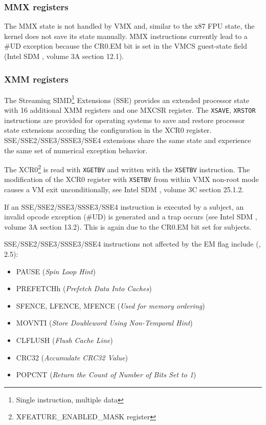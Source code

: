 \subsubsection{MMX registers}
The MMX state is not handled by VMX and, similar to the x87 FPU state, the
kernel does not save its state manually. MMX instructions currently lead to a
\#UD exception because the CR0.EM bit is set in the VMCS guest-state field
(Intel SDM \cite{IntelSDM}, volume 3A section 12.1).

\subsubsection{XMM registers}
The Streaming SIMD\footnote{Single instruction, multiple data}
Extensions (SSE) provides an extended processor state with
16 additional XMM registers and one MXCSR register. The \texttt{XSAVE},
\texttt{XRSTOR} instructions are provided for operating systems to save and
restore processor state extensions according the configuration in the XCR0
register. SSE/SSE2/SSE3/SSSE3/SSE4 extensions share the same state and
experience the same set of numerical exception behavior.

The XCR0\footnote{XFEATURE\_ENABLED\_MASK register} is read with
\texttt{XGETBV} and written with the \texttt{XSETBV} instruction. The
modification of the XCR0 register with \texttt{XSETBV} from within VMX non-root
mode causes a VM exit unconditionally, see Intel SDM \cite{IntelSDM}, volume 3C
section 25.1.2.

If an SSE/SSE2/SSE3/SSSE3/SSE4 instruction is executed by a subject, an invalid
opcode exception (\#UD) is generated and a trap occurs (see Intel SDM
\cite{IntelSDM}, volume 3A section 13.2). This is again due to the CR0.EM bit
set for subjects.

SSE/SSE2/SSE3/SSSE3/SSE4 instructions not affected by the EM flag include
(\cite{IntelSDM}, 2.5):
\begin{itemize}
	\item PAUSE (\emph{Spin Loop Hint})
	\item PREFETCHh (\emph{Prefetch Data Into Caches})
	\item SFENCE, LFENCE, MFENCE (\emph{Used for memory ordering})
	\item MOVNTI (\emph{Store Doubleword Using Non-Temporal Hint})
	\item CLFLUSH (\emph{Flush Cache Line})
	\item CRC32 (\emph{Accumulate CRC32 Value})
	\item POPCNT (\emph{Return the Count of Number of Bits Set to 1})
\end{itemize}


